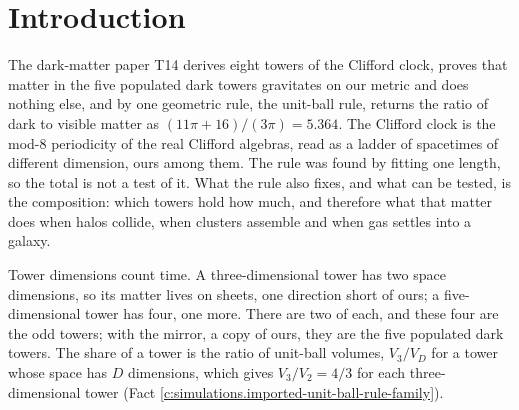 \documentclass[11pt]{article}
\theoremstyle{definition}
\theoremstyle{plain}
\begin{document}
\noindent{}
\newpage

\section{Introduction}

\label{c:note.simulations.setting-introduction}
The dark-matter paper T14 \cite{ButlerT14} derives eight towers of the Clifford clock, proves that matter in the five populated dark towers gravitates on our metric and does nothing else, and by one geometric rule, the unit-ball rule, returns the ratio of dark to visible matter as $(11\pi + 16)/(3\pi) = 5.364$. The Clifford clock is the mod-$8$ periodicity of the real Clifford algebras, read as a ladder of spacetimes of different dimension, ours among them. The rule was found by fitting one length, so the total is not a test of it. What the rule also fixes, and what can be tested, is the composition: which towers hold how much, and therefore what that matter does when halos collide, when clusters assemble and when gas settles into a galaxy.

Tower dimensions count time. A three-dimensional tower has two space dimensions, so its matter lives on sheets, one direction short of ours; a five-dimensional tower has four, one more. There are two of each, and these four are the odd towers; with the mirror, a copy of ours, they are the five populated dark towers. The share of a tower is the ratio of unit-ball volumes, $V_{3}/V_{D}$ for a tower whose space has $D$ dimensions, which gives $V_{3}/V_{2} = 4/3$ for each three-dimensional tower (Fact \ref{c:simulations.imported-unit-ball-rule-family}).
\end{document}

